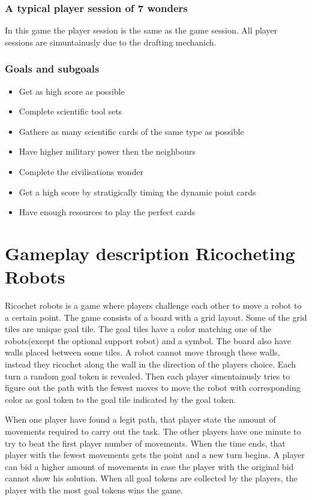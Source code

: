 \documentclass[a4paper]{article}
\begin{document}
\subsubsection{A typical player session of 7 wonders}
In this game the player session is the same as the game session. All player sessions are simuntainusly due to the drafting mechanich.

\subsubsection{Goals and subgoals}
\begin{itemize}[noitemsep,topsep=0pt,parsep=0pt,partopsep=0pt]
  \item Get as high score as possible
  \item Complete scientific tool sets
  \item Gathere as many scientific cards of the same type as possible
  \item Have higher military power then the neighbours
  \item Complete the civilisations wonder
  \item Get a high score by stratigically timing the dynamic point cards
  \item Have enough resources to play the perfect cards
\end{itemize}
\section{Gameplay description Ricocheting Robots}
Ricochet robots is a game where players challenge each other to move a robot to a certain point.
The game consists of a board with a grid layout. Some of the grid tiles are unique goal tile.
The goal tiles have a color matching one of the robots(except the optional support robot) and a symbol.
The board also have walls placed between some tiles. A robot cannot move through these walls, instead they ricochet along the wall in the direction of the players choice.
Each turn a random goal token is revealed.
Then each player simentainusly tries to figure out the path with the fewest moves to move the robot with corresponding color as goal token to the goal tile indicated by the goal token. 

When one player have found a legit path, that player state the amount of movements required to carry out the task.
The other players have one minute to try to beat the first player number of movements. When the time ends, that player with the fewest movements gets the point and a new turn begins.
A player can bid a higher amount of movements in case the player with the original bid cannot show his solution.
When all goal tokens are collected by the players, the player with the most goal tokens wins the game.
\end{document}
